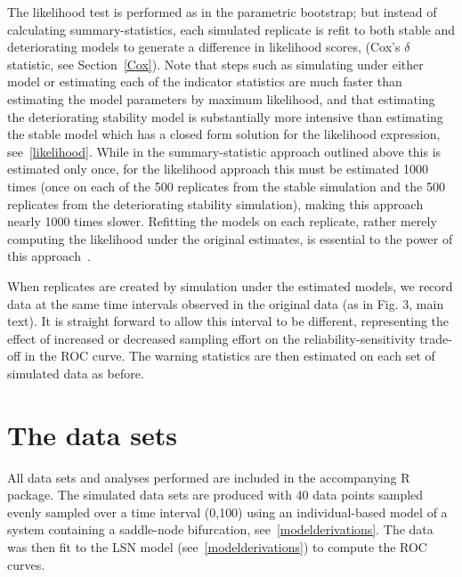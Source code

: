 \documentclass[authoryear, preprint,review,12pt]{elsarticle}
\begin{document}
The likelihood test is performed as in the parametric bootstrap; but instead of calculating summary-statistics, each simulated replicate is refit to both stable and deteriorating models to generate a difference in likelihood scores, (Cox's $\delta$ statistic, see Section~\ref{Cox}).  Note that steps such as simulating under either model or estimating each of the indicator statistics are much faster than estimating the model parameters by maximum likelihood, and that estimating the deteriorating stability model is substantially more intensive than estimating the stable model which has a closed form solution for the likelihood expression, see~\ref{likelihood}.  While in the summary-statistic approach outlined above this is estimated only once, for the likelihood approach this must be estimated 1000 times (once on each of the 500 replicates from the stable simulation and the 500 replicates from the deteriorating stability simulation), making this approach nearly 1000 times slower.  Refitting the models on each replicate, rather merely computing the likelihood under the original estimates, is essential to the power of this approach~\citep{Huelsenbeck1996}.

When replicates are created by simulation under the estimated models, we record data at the same time intervals observed in the original data (as in Fig. 3, main text).  It is straight forward to allow this interval to be different, representing the effect of increased or decreased sampling effort on the reliability-sensitivity trade-off in the ROC curve.  The warning statistics are then estimated on each set of simulated data as before.  

\section{The data sets}\label{data}
All data sets and analyses performed are included in the accompanying R package.
The simulated data sets are produced with 40 data points
sampled evenly sampled over a time interval (0,100) using an individual-based model of a system containing a saddle-node bifurcation, see~\ref{modelderivations}.  The data was then fit to the LSN model (see~\ref{modelderivations}) to compute the ROC curves.  
\end{document}

